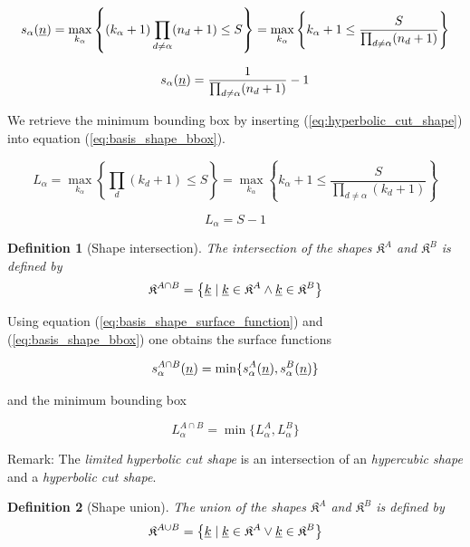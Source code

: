 \documentclass{article}
\newtheorem*{definition}{Definition}
\begin{document}
\[
  s_{\alpha}(\underline{n})=
  \max_{k_{\alpha}}\left\{(k_{\alpha}+1)\prod_{d \neq \alpha} (n_d+1) \leq S \right\} =
  \max_{k_{\alpha}}\left\{k_{\alpha}+1 \leq \frac{S}{\prod_{d \neq \alpha}(n_d+1)}\right\}
\]

\begin{equation}
s_{\alpha}(\underline{n})=\frac{1}{\prod_{d \neq \alpha} (n_d+1)}-1
\end{equation}

We retrieve the minimum bounding box by inserting (\ref{eq:hyperbolic_cut_shape}) into
equation (\ref{eq:basis_shape_bbox}).

\[
  L_{\alpha}=\max_{k_{\alpha}}\left\{\prod_d(k_d+1) \leq S\right\} =
  \max_{k_{\alpha}}\left\{k_{\alpha}+1 \leq \frac{S}{\prod_{d \neq \alpha}(k_d+1)}\right\}
\]

\begin{equation}
L_{\alpha}=S-1
\end{equation}

\begin{definition}[Shape intersection]
  The intersection of the shapes \(\mathfrak{K}^{A}\) and \(\mathfrak{K}^{B}\) is defined by
  \begin{equation}
    \label{eq:basis_shape_intersection}
    \mathfrak{K}^{A \cap B}=\left\{\underline{k} \;|\; \underline{k} \in \mathfrak{K}^A \land
      \underline{k} \in \mathfrak{K}^B
    \right\}
  \end{equation}
\end{definition}

Using equation (\ref{eq:basis_shape_surface_function}) and (\ref{eq:basis_shape_bbox})
one obtains the surface functions

\begin{equation}
  s_{\alpha}^{A \cap B}(\underline{n}) = \min\{s_{\alpha}^A(\underline{n}), s_{\alpha}^B(\underline{n})\}
\end{equation}

and the minimum bounding box

\begin{equation}
  L_{\alpha}^{A \cap B} = \min\{L_{\alpha}^{A}, L_{\alpha}^{B}\}
\end{equation}

Remark: The \emph{limited hyperbolic cut shape} is an intersection of an
\emph{hypercubic shape} and a \emph{hyperbolic cut shape}.

\begin{definition}[Shape union]
  The union of the shapes \(\mathfrak{K}^{A}\) and \(\mathfrak{K}^{B}\) is defined by
  \begin{equation}
    \label{eq:basis_shape_intersection}
    \mathfrak{K}^{A \cup B}=\left\{\underline{k} \;|\; \underline{k} \in \mathfrak{K}^A \lor
      \underline{k} \in \mathfrak{K}^B
    \right\}
  \end{equation}
\end{definition}
\end{document}
